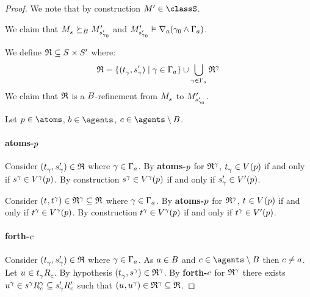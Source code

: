 \begin{proof}
We note that by construction $\kModelP \in \classS$.

We claim that $\kPModel{\kStateS} \simulatesBs \kPModelP{\kStateSP_{\gamma_0}}$ and $\kPModelP{\kStateSP_{\gamma_0}} \entails \coversA (\gamma_0 \land \Gamma_\agentA)$.

We define $\refinement \subseteq \kStates \times \kStatesP$ where:
$$
\refinement = \{(\kStateT_\gamma, \kStateSP_\gamma) \mid \gamma \in \Gamma_\agentA\} \cup \bigcup_{\gamma \in \Gamma_\agentA} \refinement^\gamma
$$
We claim that $\refinement$ is a $\agentsB$-refinement from $\kPModel{\kStateS}$ to $\kPModelP{\kStateSP_{\gamma_0}}$.

Let $\atomP \in \atoms$, $\agentB \in \agents$, $\agentC \in \agents \setminus \agentsB$.

\paragraph{atoms-$\atomP$}
Consider $(\kStateT_\gamma, \kStateSP_\gamma) \in \refinement$ where $\gamma \in \Gamma_\agentA$.
By {\bf atoms-$\atomP$} for $\refinement^\gamma$, $\kStateT_\gamma \in \kValuation(\atomP)$ if and only if $\kStateS[\gamma] \in \kValuation[\gamma](\atomP)$.
By construction $\kStateS[\gamma] \in \kValuation[\gamma](\atomP)$ if and only if $\kStateSP_\gamma \in \kValuationP(\atomP)$.

Consider $(\kStateT, \kStateT[\gamma]) \in \refinement^\gamma \subseteq \refinement$ where $\gamma \in \Gamma_\agentA$.
By {\bf atoms-$\atomP$} for $\refinement^\gamma$, $\kStateT \in \kValuation(\atomP)$ if and only if $\kStateT[\gamma] \in \kValuation[\gamma](\atomP)$.
By construction $\kStateT[\gamma] \in \kValuation[\gamma](\atomP)$ if and only if $\kStateT[\gamma] \in \kValuationP(\atomP)$.

\paragraph{forth-$\agentC$}
Consider $(\kStateT_\gamma, \kStateSP_\gamma) \in \refinement$ where $\gamma \in \Gamma_\agentA$.
As $\agentA \in \agentsB$ and $\agentC \in \agents \setminus \agentsB$ then $\agentC \neq \agentA$.
Let $\kStateU \in \kSuccessorsC{\kStateT_\gamma}$.
By hypothesis $(\kStateT_\gamma, \kStateS[\gamma]) \in \refinement^\gamma$.
By {\bf forth-$\agentC$} for $\refinement^\gamma$ there exists $\kStateU[\gamma] \in \kSuccessorsC[\gamma]{\kStateS[\gamma]} \subseteq \kSuccessorsPC{\kStateSP_\gamma}$ such that $(\kStateU, \kStateU[\gamma]) \in \refinement^\gamma \subseteq \refinement$.


\end{proof}
